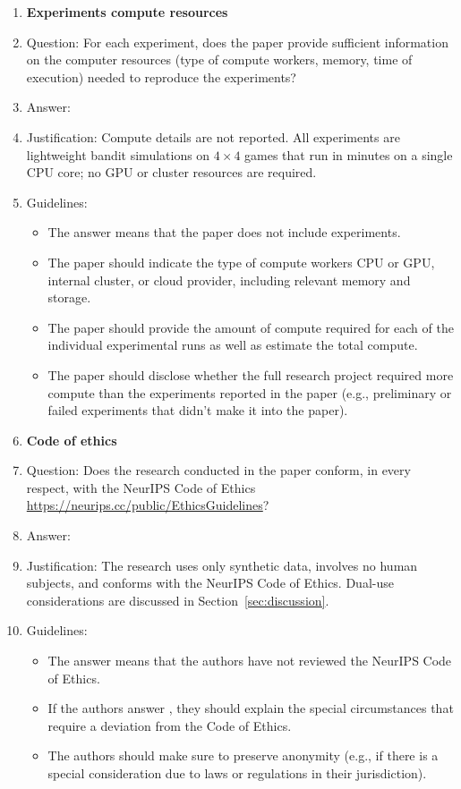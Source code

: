 \documentclass{article}
\begin{document}
\begin{enumerate}
\item {\bf Experiments compute resources}
    \item[] Question: For each experiment, does the paper provide sufficient information on the computer resources (type of compute workers, memory, time of execution) needed to reproduce the experiments?
    \item[] Answer: \answerNo{}
    \item[] Justification: Compute details are not reported. All experiments are lightweight bandit simulations on $4\times 4$ games that run in minutes on a single CPU core; no GPU or cluster resources are required.
    \item[] Guidelines:
    \begin{itemize}
        \item The answer \answerNA{} means that the paper does not include experiments.
        \item The paper should indicate the type of compute workers CPU or GPU, internal cluster, or cloud provider, including relevant memory and storage.
        \item The paper should provide the amount of compute required for each of the individual experimental runs as well as estimate the total compute.
        \item The paper should disclose whether the full research project required more compute than the experiments reported in the paper (e.g., preliminary or failed experiments that didn't make it into the paper).
    \end{itemize}
   
\item {\bf Code of ethics}
    \item[] Question: Does the research conducted in the paper conform, in every respect, with the NeurIPS Code of Ethics \url{https://neurips.cc/public/EthicsGuidelines}?
    \item[] Answer: \answerYes{}
    \item[] Justification: The research uses only synthetic data, involves no human subjects, and conforms with the NeurIPS Code of Ethics. Dual-use considerations are discussed in Section~\ref{sec:discussion}.
    \item[] Guidelines:
    \begin{itemize}
        \item The answer \answerNA{} means that the authors have not reviewed the NeurIPS Code of Ethics.
        \item If the authors answer \answerNo, they should explain the special circumstances that require a deviation from the Code of Ethics.
        \item The authors should make sure to preserve anonymity (e.g., if there is a special consideration due to laws or regulations in their jurisdiction).
    \end{itemize}



\end{enumerate}
\end{document}
